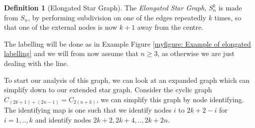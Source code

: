 \documentclass[a4paper,10pt]{article}
\theoremstyle{definition}
\newtheorem{definition}[theorem]{Definition}
\theoremstyle{definition}
\theoremstyle{remark}
\theoremstyle{definition}
\begin{document}
\begin{definition}[Elongated Star Graph]
The \textit{Elongated Star Graph}, $S_{n}^{k}$ is made from $S_{n}$, by performing subdivision on one of the edges repeatedly $k$ times, so that one of the external nodes is now $k+1$ away from the centre.
\end{definition}

The labelling will be done as in Example Figure \ref{myfigure: Example of elongated labelling} and we will from now assume that $n \geq 3$, as otherwise we are just dealing with the line.


\begin{myfigure}
\begin{center}
\end{center}
\caption{Labeling on the graph $S_{4}^5$.}
\label{myfigure: Example of elongated labelling}
\end{myfigure}

To start our analysis of this graph, we can look at an expanded graph which can simplify down to our extended star graph. Consider the cyclic graph $C_{(2k+1)+(2n-1)}=C_{2(n+k)}$, we can simplify this graph by node identifying. The identifying map is one such that we identify nodes $i$ to $2k+2-i$ for $i=1,..,k$ and identify nodes $2k+2,2k+4,..,2k+2n$.
\end{document}
